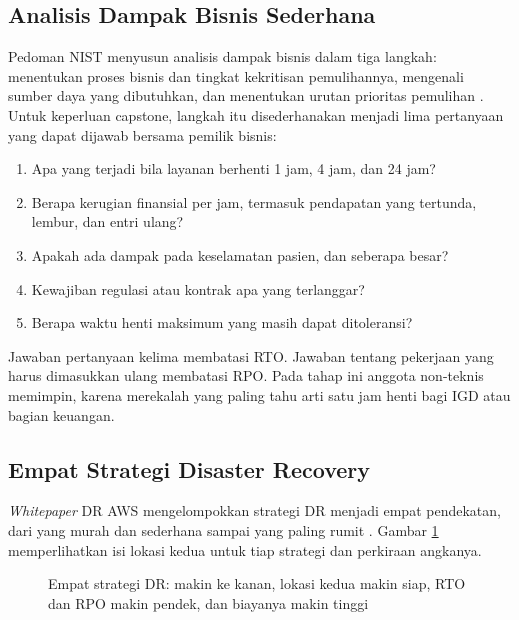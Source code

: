 \subsection{Analisis Dampak Bisnis Sederhana}

Pedoman NIST menyusun analisis dampak bisnis dalam tiga langkah: menentukan proses bisnis dan
tingkat kekritisan pemulihannya, mengenali sumber daya yang dibutuhkan, dan menentukan urutan
prioritas pemulihan \cite{c12-nist800-34}. Untuk keperluan capstone, langkah itu disederhanakan
menjadi lima pertanyaan yang dapat dijawab bersama pemilik bisnis:
\begin{enumerate}
  \item Apa yang terjadi bila layanan berhenti 1 jam, 4 jam, dan 24 jam?
  \item Berapa kerugian finansial per jam, termasuk pendapatan yang tertunda, lembur, dan entri
        ulang?
  \item Apakah ada dampak pada keselamatan pasien, dan seberapa besar?
  \item Kewajiban regulasi atau kontrak apa yang terlanggar?
  \item Berapa waktu henti maksimum yang masih dapat ditoleransi?
\end{enumerate}
Jawaban pertanyaan kelima membatasi RTO. Jawaban tentang pekerjaan yang harus dimasukkan ulang
membatasi RPO. Pada tahap ini anggota non-teknis memimpin, karena merekalah yang paling tahu arti
satu jam henti bagi IGD atau bagian keuangan.

\subsection{Empat Strategi Disaster Recovery}

\textit{Whitepaper} DR AWS mengelompokkan strategi DR menjadi empat pendekatan, dari yang murah dan
sederhana sampai yang paling rumit \cite{c12-aws-dr2021}. Gambar \ref{fig:ch12-strategi-dr}
memperlihatkan isi lokasi kedua untuk tiap strategi dan perkiraan angkanya.

\begin{figure}[!htb]
  \centering
  
  \caption{Empat strategi DR: makin ke kanan, lokasi kedua makin siap, RTO dan RPO makin pendek,
           dan biayanya makin tinggi}
  \label{fig:ch12-strategi-dr}
\end{figure}

